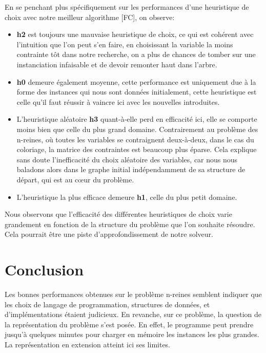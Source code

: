 \documentclass[14pt]{article}
\begin{document}
En se penchant plus spécifiquement sur les performances d'une heuristique de choix avec notre meilleur algorithme [FC], on observe:
\begin{itemize}
	\item \textbf{h2} est toujours une mauvaise heuristique de choix, ce qui est cohérent avec l'intuition que l'on peut s'en faire, en choisissant la variable la moins contrainte tôt dans notre recherche, on a plus de chances de tomber sur une instanciation infaisable et de devoir remonter haut dans l'arbre.
	\item \textbf{h0} demeure également moyenne, cette performance est uniquement due à la forme des instances qui nous sont données initialement, cette heuristique est celle qu'il faut réussir à vaincre ici avec les nouvelles introduites.
	\item L'heuristique aléatoire \textbf{h3} quant-à-elle perd en efficacité ici, elle se comporte moins bien que celle du plus grand domaine. Contrairement au problème des n-reines, où toutes les variables se contraignent deux-à-deux, dans le cas du coloriage, la matrice des contraintes est beaucoup plus éparse. Cela explique sans doute l'inefficacité du choix aléatoire des variables, car nous nous baladons alors dans le graphe initial indépendamment de sa structure de départ, qui est au cœur du problème.
	\item L'heuristique la plus efficace demeure \textbf{h1}, celle du plus petit domaine.
\end{itemize}

Nous observons que l'efficacité des différentes heuristiques de choix varie grandement en fonction de la structure du problème que l'on souhaite résoudre. Cela pourrait être une piste d'approfondissement de notre solveur.

\clearpage

\section{Conclusion}

Les bonnes performances obtenues sur le problème n-reines semblent indiquer que les choix de langage de programmation, structures de données, et d'implémentations étaient judicieux. En revanche, sur ce problème, la question de la représentation du problème s'est posée. En effet, le programme peut prendre jusqu'à quelques minutes pour charger en mémoire les instances les plus grandes. La représentation en extension atteint ici ses limites.\\
\end{document}
